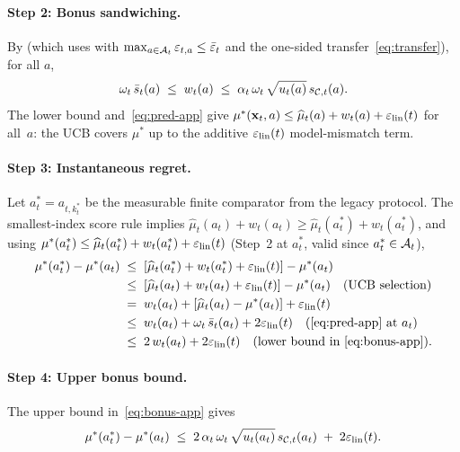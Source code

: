 \paragraph{Step 2: Bonus sandwiching.}
By  (which uses  with
$\max_{a\in\mathcal{A}_t}\varepsilon_{t,a}\le\bar\varepsilon_t$ and the one-sided
transfer~\eqref{eq:transfer}), for all $a$,
\begin{equation}\label{eq:bonus-app}
  \omega_t\,\bar s_t(a)
  \;\le\;
  w_t(a)
  \;\le\;
  \alpha_t\,\omega_t\,\sqrt{u_t(a)}\,s_{\mathcal{C},t}(a).
\end{equation}
The lower bound and~\eqref{eq:pred-app} give
$\mu^*(\mathbf{x}_t,a)\le \widehat\mu_t(a)+w_t(a)+\varepsilon_{\mathrm{lin}}(t)$ for all~$a$: the UCB covers
$\mu^*$ up to the additive $\varepsilon_{\mathrm{lin}}(t)$ model-mismatch term.

\paragraph{Step 3: Instantaneous regret.}
Let $a_t^*=a_{t,k_t^*}$ be the measurable finite comparator from the legacy
protocol.  The smallest-index score rule implies
$\widehat\mu_t(a_t)+w_t(a_t)\ge \widehat\mu_t(a_t^*)+w_t(a_t^*)$, and using
$\mu^*(a_t^*)\le \widehat\mu_t(a_t^*)+w_t(a_t^*)+\varepsilon_{\mathrm{lin}}(t)$ (Step~2 at $a_t^*$, valid
since $a_t^*\in\mathcal{A}_t$),
\begin{align*}
  \mu^*(a_t^*)-\mu^*(a_t)
  &\;\le\; [\widehat\mu_t(a_t^*)+w_t(a_t^*)+\varepsilon_{\mathrm{lin}}(t)] - \mu^*(a_t) \\
  &\;\le\; [\widehat\mu_t(a_t)+w_t(a_t)+\varepsilon_{\mathrm{lin}}(t)] - \mu^*(a_t)
    \quad\text{(UCB selection)} \\
  &\;=\; w_t(a_t) + [\widehat\mu_t(a_t)-\mu^*(a_t)] + \varepsilon_{\mathrm{lin}}(t) \\
  &\;\le\; w_t(a_t) + \omega_t\,\bar s_t(a_t) + 2\varepsilon_{\mathrm{lin}}(t)
    \quad\text{(\eqref{eq:pred-app} at $a_t$)} \\
  &\;\le\; 2\,w_t(a_t) + 2\varepsilon_{\mathrm{lin}}(t)
    \quad\text{(lower bound in~\eqref{eq:bonus-app})}.
\end{align*}

\paragraph{Step 4: Upper bonus bound.}
The upper bound in~\eqref{eq:bonus-app} gives
\begin{equation}\label{eq:regret-round}
  \mu^*(a_t^*)-\mu^*(a_t)
  \;\le\;
  2\,\alpha_t\,\omega_t\,\sqrt{u_t(a_t)}\,s_{\mathcal{C},t}(a_t)
  \;+\; 2\varepsilon_{\mathrm{lin}}(t).
\end{equation}


